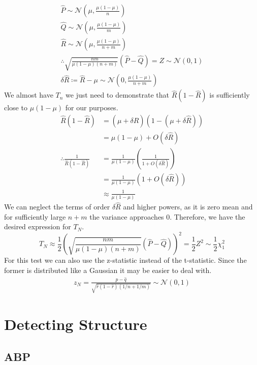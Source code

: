 \documentclass[]{article}
\newcommand{\Gaussian}{\mathcal{N}}
\begin{document}
%
\begin{equation*}
\begin{gathered}
\hat{P} \sim \Gaussian \left( \mu, \frac{\mu(1-\mu)}{n} \right) \\
\hat{Q} \sim \Gaussian \left(\mu, \frac{\mu(1-\mu)}{m} \right) \\
\hat{R} \sim \Gaussian \left(\mu, \frac{\mu(1-\mu)}{n+m} \right) \\
\therefore  \sqrt{\frac{nm}{\mu(1-\mu)(n+m)}} (\hat{P} - \hat{Q}) = Z \sim \Gaussian \left(0, 1 \right) \\
\delta \hat{R} \coloneqq \hat{R} - \mu \sim \Gaussian \left( 0, \frac{\mu(1-\mu)}{n+m} \right)
\end{gathered}
\end{equation*}
%
We almost have $T_n$ we just need to demonstrate that $\hat{R}(1-\hat{R})$ is sufficiently close to $\mu(1-\mu)$ for our purposes.
%
\begin{align*}
\hat{R}(1-\hat{R}) &= (\mu + \delta\hat{R})(1-(\mu + \delta \hat{R})) \\
&= \mu(1-\mu) + O(\delta\hat{R}) \\
\therefore \frac{1}{\hat{R}(1-\hat{R})} &= \frac{1}{\mu(1-\mu)} \left(\frac{1}{1+O(\delta\hat{R})}\right) \\
&= \frac{1}{\mu(1-\mu)} (1 + O(\delta\hat{R})) \\
&\approx \frac{1}{\mu(1-\mu)}
\end{align*}
%
We can neglect the terms of order $\delta\hat{R}$ and higher powers, as it is zero mean and for sufficiently large $n+m$ the variance approaches 0. Therefore, we have the desired expression for $T_N$.
%
\begin{equation}
T_N \approx \frac{1}{2} \left(
\sqrt{\frac{nm}{\mu(1-\mu)(n+m)}}
(\hat{P} - \hat{Q})
\right)^2 = \frac{1}{2} Z^2 \sim \frac{1}{2} \chi^2_1
\end{equation}
%
For this test we can also use the z-statistic instead of the t-statistic. Since the former is distributed like a Gaussian it may be easier to deal with.
\begin{align}
z_N = \frac{\hat{p} - \hat{q}}{\sqrt{\hat{r}(1-\hat{r})\left(1/n + 1/m\right)}} \sim \Gaussian(0, 1)
\end{align}


\section{Detecting Structure}
\subsection{ABP}
\end{document}
